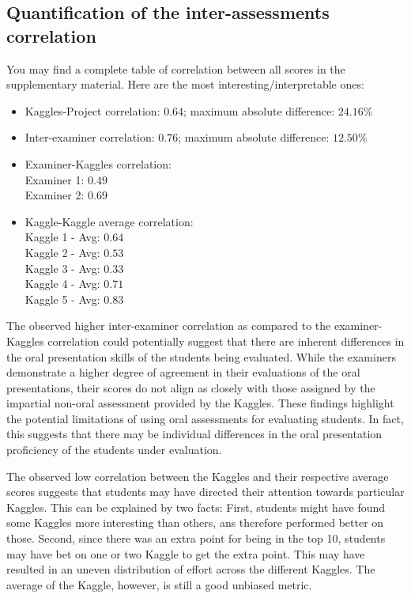 \documentclass[a4paper]{article}
\begin{document}
	\subsection{Quantification of the inter-assessments correlation}
	You may find a complete table of correlation between all scores in the supplementary material.
	Here are the most interesting/interpretable ones:
	\begin{itemize}
		\item Kaggles-Project correlation: $0.64$; maximum absolute difference: $24.16\%$
		\item Inter-examiner correlation: $0.76$; maximum absolute difference: $12.50\%$
		\item Examiner-Kaggles correlation:\\
		Examiner 1: $0.49$\\
		Examiner 2: $0.69$
		\item Kaggle-Kaggle average correlation:\\
		Kaggle 1 - Avg: $0.64$\\
		Kaggle 2 - Avg: $0.53$\\
		Kaggle 3 - Avg: $0.33$\\
		Kaggle 4 - Avg: $0.71$\\
		Kaggle 5 - Avg: $0.83$
	\end{itemize}
	The observed higher inter-examiner correlation as compared to the examiner-Kaggles correlation could potentially suggest that there are inherent differences in the oral presentation skills of the students being evaluated.
	While the examiners demonstrate a higher degree of agreement in their evaluations of the oral presentations, their scores do not align as closely with those assigned by the impartial non-oral assessment provided by the Kaggles.
	These findings highlight the potential limitations of using oral assessments for evaluating students.
	In fact, this suggests that there may be individual differences in the oral presentation proficiency of the students under evaluation.
	
	The observed low correlation between the Kaggles and their respective average scores suggests that students may have directed their attention towards particular Kaggles.
	This can be explained by two facts:
	First, students might have found some Kaggles more interesting than others, ans therefore performed better on those.
	Second, since there was an extra point for being in the top 10, students may have bet on one or two Kaggle to get the extra point.
	This may have resulted in an uneven distribution of effort across the different Kaggles.
	The average of the Kaggle, however, is still a good unbiased metric.
	
\end{document}
